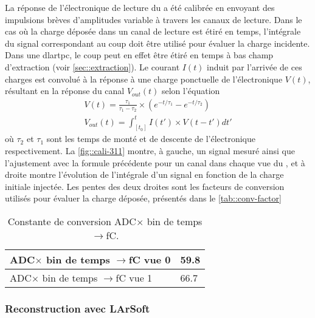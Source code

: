         La réponse de l'électronique de lecture du \TOO{} a été calibrée en envoyant des impulsions brèves d'amplitudes variable à travers les canaux de lecture. Dans le cas où la charge déposée dans un canal de lecture est étiré en temps, l'intégrale du signal correspondant au coup doit être utilisé pour évaluer la charge incidente. Dans une \gls{dlartpc}, le coup peut en effet être étiré en temps à bas champ d'extraction (voir \autoref{sec::extraction}). Le courant $I(t)$ induit par l'arrivée de ces charges est convolué à la réponse à une charge ponctuelle de l'électronique $V(t)$, résultant en la réponse du canal $V_{out}(t)$ selon l'équation
        \begin{eqnarray}\label{eq::resp-function}
          V(t) = \frac{\tau_1}{\tau_1-\tau_2}\times\left(e^{-t/\tau_1}-e^{-t/\tau_2}\right) \\ 
          V_{out}(t) = \int_{[t_0]}^{t} I(t')\times V(t-t')dt'
        \end{eqnarray}
        où $\tau_2$ et $\tau_1$ sont les temps de monté et de descente de l'électronique respectivement. La \autoref{fig::cali-311} montre, à gauche, un signal mesuré ainsi que l'ajustement avec la formule précédente pour un canal dans chaque vue du \TOO, et à droite montre l'évolution de l'intégrale d'un signal en fonction de la charge initiale injectée. Les pentes des deux droites sont les facteurs de conversion utilisés pour évaluer la charge déposée, présentés dans le \autoref{tab::conv-factor}
        \begin{table}[]
          \centering
          \begin{tabular}{|l|l|}
            \hline
            ADC$\times$ bin de temps $\to$\si{\femto\coulomb} vue 0 & 59.8 \\ \hline \hline
            ADC$\times$ bin de temps $\to$\si{\femto\coulomb} vue 1 & 66.7 \\ \hline
          \end{tabular}
          \caption[Constante de conversion ADC$\times$ bin de temps $\to$\si{\femto\coulomb}]{\label{tab::conv-factor}Constante de conversion ADC$\times$ bin de temps $\to$\si{\femto\coulomb}.}
        \end{table}

      \subsubsection{Reconstruction avec LArSoft}

